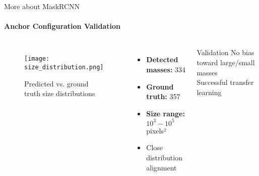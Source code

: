 \begin{frame}{More about MaskRCNN}
\framesubtitle{Anchor Configuration Validation}
    \begin{columns}
        \begin{figure}
            \centering
            \texttt{[image: size\_distribution.png]}
            \caption{Predicted vs. ground truth size distributions}
        \end{figure}
        
        \begin{itemize}
            \item \textbf{Detected masses:} 334
            \item \textbf{Ground truth:} 357
            \item \textbf{Size range:} $10^3-10^5$ pixels²
            \item Close distribution alignment
        \end{itemize}
        
        \vspace{0.5cm}
        \begin{block}{Validation}
             No bias toward large/small masses\\
             Successful transfer learning\\
        \end{block}
    \end{columns}
\end{frame}
